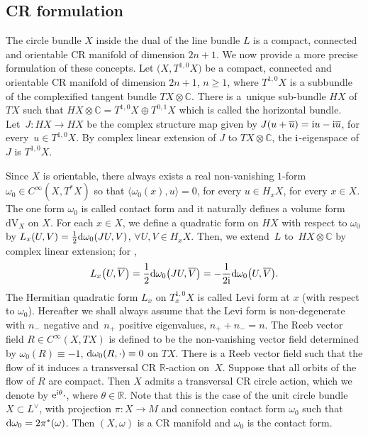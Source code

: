 \documentclass[10pt,a4paper]{amsart}
\numberwithin{equation}{section}
\newcommand{\ol}{\overline}
\begin{document}
 	\subsection{CR formulation} \label{sec:crform}
 		
	The circle bundle $X$ inside the dual of the line bundle $L$ is a compact, connected and orientable CR manifold of dimension $2n+1$. We now provide a more precise formulation of these concepts. Let $\bigl(X, T^{1,0}X\bigr)$ be a compact, connected and orientable CR manifold of dimension $2n+1$, $n\geq 1$, where $T^{1,0}X$ is a subbundle of the complexified tangent bundle $ TX\otimes \mathbb{C}$. There is a~unique sub-bundle $HX$ of $TX$ such that
$
 HX\otimes \mathbb{C}=T^{1,0}X \oplus T^{0,1}X
$
 which is called the horizontal bundle. Let~${J \colon HX\rightarrow HX}$ be the complex structure map given by $J(u+\ol u)={\rm i}u-{\rm i}\ol u$, for every~${u\in T^{1,0}X}$. By complex linear extension of $J$ to $TX\otimes \mathbb{C}$, the ${\rm i}$-eigenspace of $J$ is $T^{1,0}X$.
	
	Since $X$ is orientable, there always exists a real non-vanishing $1$-form $\omega_0\in {C}^{\infty}(X,T^*X)$ so that $\langle \omega_0(x) , u \rangle=0$, for every $u\in H_xX$, for every $x\in X$. The one form $\omega_0$ is called contact form and it naturally defines a volume form $\mathrm{dV}_X$ on $X$. For each $x \in X$, we define a quadratic form on $HX$ with respect to $\omega_0$ by
	${L}_x(U,V) =\frac{1}{2}{\rm d}\omega_0(JU, V)$, $ \forall U, V \in H_xX$.
	Then, we extend~${L}$ to~${HX\otimes \mathbb{C}}$ by complex linear extension; for ,
	\[
	{L}_x\bigl(U,\overline{V}\bigr) = \frac{1}{2} {\rm d}\omega_0\bigl(JU, \overline{V}\bigr) = -\frac{1}{2{\rm i}} {\rm d}\omega_0\bigl(U,\overline{V}\bigr).
	\]
	The Hermitian quadratic form ${L}_x$ on $T^{1,0}_xX$ is called Levi form at $x$ (with respect to $\omega_0$). Hereafter we shall always assume that the Levi form is non-degenerate with $n_-$ negative and~$n_+$ positive eigenvalues, $n_++n_-=n$. The Reeb vector field $R\in{C}^\infty(X,TX)$ is defined to be the non-vanishing vector field determined by
$\omega_0(R)\equiv -1$, $ 		{\rm d}\omega_0(R,\cdot)\equiv0 $ on $ TX$.
	There is a Reeb vector field such that the flow of it induces a transversal CR $\mathbb{R}$-action on~$X$. Suppose that all orbits of the flow of $R$ are compact. Then $X$ admits a transversal CR circle action, which we denote by ${\rm e}^{{\rm i} \theta}\cdot$, where $\theta\in \mathbb{R}$. Note that this is the case of the unit circle bundle~${X\subset L^{\vee}}$, with projection $\pi\colon X\rightarrow M$ and connection contact form $\omega_0$ such that~${{\rm d}\omega_0 =2 \pi^*(\omega)}$. Then $(X, \omega)$ is a CR manifold and $\omega_0$ is the contact form.
	
\end{document}
